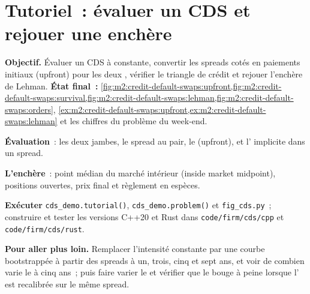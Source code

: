\section{Tutoriel~: évaluer un CDS et rejouer une enchère}\label{tut:m2:credit-default-swaps:cds}

\begin{tutorial}
\textbf{Objectif.} Évaluer un CDS à  constante, convertir les spreads cotés en paiements initiaux (upfront)
pour les deux , vérifier le triangle de crédit et rejouer
l'enchère de Lehman.
\textbf{État final~:} \cref{fig:m2:credit-default-swaps:upfront,fig:m2:credit-default-swaps:survival,fig:m2:credit-default-swaps:lehman,fig:m2:credit-default-swaps:orders},
\cref{ex:m2:credit-default-swaps:upfront,ex:m2:credit-default-swaps:lehman} et les
chiffres du problème du week-end.
\begin{tutsteps}
\item \textbf{Évaluation}~: les deux jambes, le spread au pair, le  (upfront),
et l' implicite dans un spread.
\label{lst:m2:credit-default-swaps:price}
\item \textbf{L'enchère}~: point médian du marché intérieur (inside market midpoint), positions ouvertes, prix final et règlement
en espèces.
\label{lst:m2:credit-default-swaps:auction}
\item \textbf{Exécuter} \texttt{cds\_demo.tutorial()}, \texttt{cds\_demo.problem()} et
\texttt{fig\_cds.py}~; construire et tester les versions C++20 et Rust dans
\texttt{code/firm/cds/cpp} et \texttt{code/firm/cds/rust}.
\end{tutsteps}
\textbf{Pour aller plus loin.} Remplacer l'intensité constante par une courbe bootstrappée à partir des spreads à un,
trois, cinq et sept ans, et voir de combien varie le  à cinq ans~;
puis faire varier le  et vérifier que le  bouge à peine lorsque l'
est recalibrée sur le même spread.
\end{tutorial}

